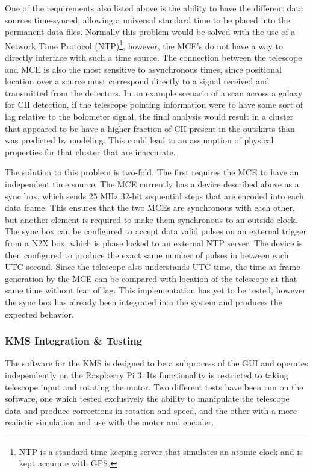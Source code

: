 \documentclass[manuscript]{aastex}
\begin{document}
One of the requirements also listed above is the ability to have the different data sources time-synced, allowing a universal standard time to be placed into the permanent data files. Normally this problem would be solved with the use of a Network Time Protocol (NTP)\footnote{ NTP is a standard time keeping server that simulates an atomic clock and is kept accurate with GPS.}, however, the MCE's do not have a way to directly interface with such a time source. The connection between the telescope and MCE is also the most sensitive to asynchronous times, since positional location over a source must correspond directly to a signal received and transmitted from the detectors. In an example scenario of a scan across a galaxy for CII detection, if the telescope pointing information were to have some sort of lag relative to the bolometer signal, the final analysis would result in a cluster that appeared to be have a higher fraction of CII present in the outskirts than was predicted by modeling. This could lead to an assumption of physical properties for that cluster that are inaccurate. 
 
The solution to this problem is two-fold. The first requires the MCE to have an independent time source. The MCE currently has a device described above as a sync box, which sends 25 MHz 32-bit sequential steps that are encoded into each data frame. This ensures that the two MCEs are synchronous with each other, but another element is required to make them synchronous to an outside clock.  The sync box can be configured to accept data valid pulses on an external trigger from a N2X box, which is phase locked to an external NTP server. The device is then configured to produce the exact same number of pulses in between each UTC second. Since the telescope also understands UTC time, the time at frame generation by the MCE can be compared with location of the telescope at that same time without fear of lag. This implementation has yet to be tested, however the sync box has already been integrated into the system and produces the expected behavior. 

\subsubsection{KMS Integration \& Testing}

The software for the KMS is designed to be a subprocess of the GUI and operates independently on the Raspberry Pi 3. Its functionality is restricted to taking telescope input and rotating the motor. Two different tests have been run on the software, one which tested exclusively the ability to manipulate the telescope data and produce corrections in rotation and speed, and the other with a more realistic simulation and use with the motor and encoder. 
\end{document}
